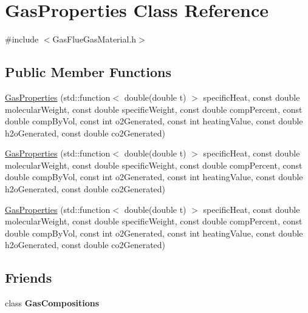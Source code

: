 \hypertarget{class_gas_properties}{}\section{Gas\+Properties Class Reference}
\label{class_gas_properties}


{\ttfamily \#include $<$Gas\+Flue\+Gas\+Material.\+h$>$}

\subsection*{Public Member Functions}
\begin{DoxyCompactItemize}
\item 
\hyperlink{class_gas_properties_a95b506951beca31785d5207ff744ead9}{Gas\+Properties} (std\+::function$<$ double(double t) $>$ specific\+Heat, const double molecular\+Weight, const double specific\+Weight, const double comp\+Percent, const double comp\+By\+Vol, const int o2\+Generated, const int heating\+Value, const double h2o\+Generated, const double co2\+Generated)
\item 
\hyperlink{class_gas_properties_a95b506951beca31785d5207ff744ead9}{Gas\+Properties} (std\+::function$<$ double(double t) $>$ specific\+Heat, const double molecular\+Weight, const double specific\+Weight, const double comp\+Percent, const double comp\+By\+Vol, const int o2\+Generated, const int heating\+Value, const double h2o\+Generated, const double co2\+Generated)
\item 
\hyperlink{class_gas_properties_a95b506951beca31785d5207ff744ead9}{Gas\+Properties} (std\+::function$<$ double(double t) $>$ specific\+Heat, const double molecular\+Weight, const double specific\+Weight, const double comp\+Percent, const double comp\+By\+Vol, const int o2\+Generated, const int heating\+Value, const double h2o\+Generated, const double co2\+Generated)
\end{DoxyCompactItemize}
\subsection*{Friends}
\begin{DoxyCompactItemize}
\item 
\mbox{\label{class_gas_properties_a6e100081844218e60cdfbed234a59292}} 
class {\bfseries Gas\+Compositions}
\end{DoxyCompactItemize}


